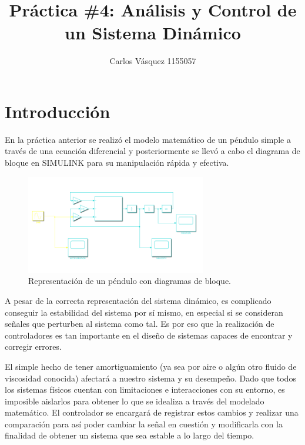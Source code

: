 \documentclass[12pt, letterpaper]{article}
\title{Práctica \#4: Análisis y Control de un Sistema Dinámico}
\author{Carlos Vásquez 1155057}
\begin{document}
\maketitle
\section*{Introducción}
En la práctica anterior se realizó el modelo matemático de un péndulo simple a través de una ecuación diferencial y posteriormente se llevó a cabo el diagrama de bloque en SIMULINK para su manipulación rápida y efectiva.

\begin{figure}[H]
	\centering
	\includegraphics[width=0.7\textwidth]{pendulum.png}
	\caption{Representación de un péndulo con diagramas de bloque.}
\end{figure}

A pesar de la correcta representación del sistema dinámico, es complicado conseguir la estabilidad del sistema por sí mismo, en especial si se consideran señales que perturben al sistema como tal. Es por eso que la realización de controladores es tan importante en el diseño de sistemas capaces de encontrar y corregir errores.

El simple hecho de tener amortiguamiento (ya sea por aire o algún otro fluido de viscosidad conocida) afectará a nuestro sistema y su desempeño. Dado que todos los sistemas físicos cuentan con limitaciones e interacciones con su entorno, es imposible aislarlos para obtener lo que se idealiza a través del modelado matemático. El controlador se encargará de registrar estos cambios y realizar una comparación para así poder cambiar la señal en cuestión y modificarla con la finalidad de obtener un sistema que sea estable a lo largo del tiempo.
\end{document}
